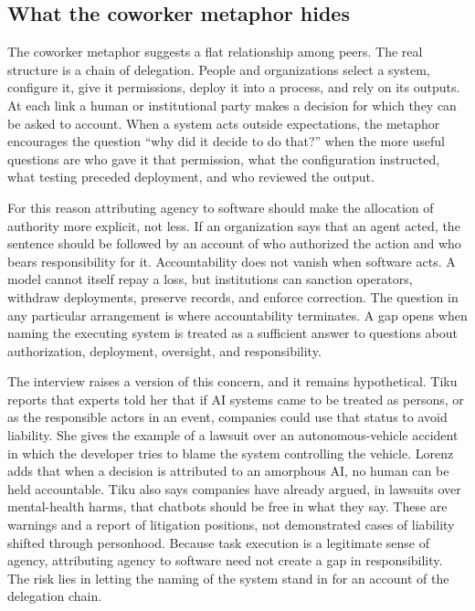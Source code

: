 \documentclass[11pt]{article}
\begin{document}
\subsection{What the coworker metaphor hides}

The coworker metaphor suggests a flat relationship among peers. The real structure is a chain of delegation. People and organizations select a system, configure it, give it permissions, deploy it into a process, and rely on its outputs. At each link a human or institutional party makes a decision for which they can be asked to account. When a system acts outside expectations, the metaphor encourages the question ``why did it decide to do that?'' when the more useful questions are who gave it that permission, what the configuration instructed, what testing preceded deployment, and who reviewed the output.

For this reason attributing agency to software should make the allocation of authority more explicit, not less. If an organization says that an agent acted, the sentence should be followed by an account of who authorized the action and who bears responsibility for it. Accountability does not vanish when software acts. A model cannot itself repay a loss, but institutions can sanction operators, withdraw deployments, preserve records, and enforce correction. The question in any particular arrangement is where accountability terminates. A gap opens when naming the executing system is treated as a sufficient answer to questions about authorization, deployment, oversight, and responsibility.

The interview raises a version of this concern, and it remains hypothetical. Tiku reports that experts told her that if AI systems came to be treated as persons, or as the responsible actors in an event, companies could use that status to avoid liability. She gives the example of a lawsuit over an autonomous-vehicle accident in which the developer tries to blame the system controlling the vehicle. Lorenz adds that when a decision is attributed to an amorphous AI, no human can be held accountable. Tiku also says companies have already argued, in lawsuits over mental-health harms, that chatbots should be free in what they say. These are warnings and a report of litigation positions, not demonstrated cases of liability shifted through personhood. Because task execution is a legitimate sense of agency, attributing agency to software need not create a gap in responsibility. The risk lies in letting the naming of the system stand in for an account of the delegation chain.
\end{document}
